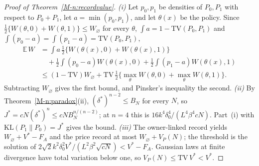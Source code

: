 \documentclass[12pt]{article}
\theoremstyle{definition}
\theoremstyle{remark}
\newcommand{\KL}{\mathrm{KL}}
\providecommand{\TV}{\mathrm{TV}}\providecommand{\Var}{\mathrm{Var}}\providecommand{\supp}{\mathrm{supp}}
\begin{document}
\begin{proof}[Proof of Theorem~\ref{M-n:recordvalue}]
\emph{(i)} Let $p_0, p_1$ be densities of $P_0, P_1$ with respect to $P_0 + P_1$, let $a = \min(p_0, p_1)$, and let $\theta(x)$ be the policy. Since $\tfrac12\{W(\theta, 0) + W(\theta, 1)\} \le W_\varnothing$ for every $\theta$, $\int a = 1 - \TV(P_0, P_1)$ and $\int (p_0 - a) = \int (p_1 - a) = \TV(P_0, P_1)$,
\begin{align*}
  \mathbb{E}\, W &= \int a\, \tfrac12\{W(\theta(x), 0) + W(\theta(x), 1)\} \\
  &\quad + \tfrac12 \int (p_0 - a) W(\theta(x), 0) + \tfrac12 \int (p_1 - a) W(\theta(x), 1) \\
  &\le (1 - \TV) W_\varnothing + \TV\, \tfrac12\{\max_\theta W(\theta, 0) + \max_\theta W(\theta, 1)\}.
\end{align*}
Subtracting $W_\varnothing$ gives the first bound, and Pinsker's inequality the second. \emph{(ii)} By Theorem~\ref{M-n:paradox}(ii), $(\delta^*)^{n-2} \le B_N$ for every $N$, so $J^* = cN(\delta^*)^n \le cN B_N^{n/(n-2)}$; at $n = 4$ this is $16 k^4 \delta_0^4 / (L^4 \beta^4 cN)$. Part~(i) with $\KL(P_1 \| P_0) = J^*$ gives the bound. \emph{(iii)} The owner-linked record yields $W_\varnothing + V^* - F_A$ and the price record at most $W_\varnothing + V_P(N)$; the threshold is the solution of $2\sqrt{2} k^2 \delta_0^2 V^* / (L^2 \beta^2 \sqrt{cN}) < V^* - F_A$. Gaussian laws at finite divergence have total variation below one, so $V_P(N) \le \TV\, V^* < V^*$.
\end{proof}
\end{document}
